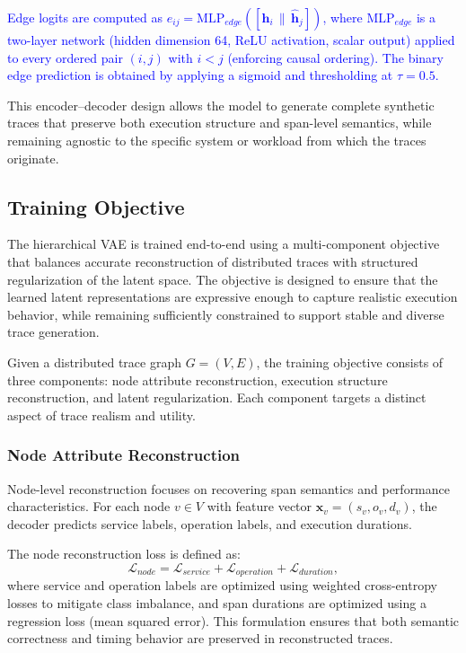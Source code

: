 \documentclass[sigconf,review]{acmart}
\begin{document}
\textcolor{blue}{Edge logits are computed as $e_{ij} = \text{MLP}_{edge}([\hat{\mathbf{h}}_i \,\|\, \hat{\mathbf{h}}_j])$, where $\text{MLP}_{edge}$ is a two-layer network (hidden dimension 64, ReLU activation, scalar output) applied to every ordered pair $(i,j)$ with $i < j$ (enforcing causal ordering). The binary edge prediction is obtained by applying a sigmoid and thresholding at $\tau = 0.5$.}

This encoder--decoder design allows the model to generate complete synthetic traces that preserve both execution structure and span-level semantics, while remaining agnostic to the specific system or workload from which the traces originate.




\subsection{Training Objective}
\label{sec:training}

The hierarchical VAE is trained end-to-end using a multi-component objective that balances accurate reconstruction of distributed traces with structured regularization of the latent space. The objective is designed to ensure that the learned latent representations are expressive enough to capture realistic execution behavior, while remaining sufficiently constrained to support stable and diverse trace generation.

Given a distributed trace graph $G = (V, E)$, the training objective consists of three components: node attribute reconstruction, execution structure reconstruction, and latent regularization. Each component targets a distinct aspect of trace realism and utility.

\subsubsection{Node Attribute Reconstruction}

Node-level reconstruction focuses on recovering span semantics and performance characteristics. For each node $v \in V$ with feature vector $\mathbf{x}_v = (s_v, o_v, d_v)$, the decoder predicts service labels, operation labels, and execution durations.

The node reconstruction loss is defined as:
\begin{equation}
\mathcal{L}_{node} =
\mathcal{L}_{service} +
\mathcal{L}_{operation} +
\mathcal{L}_{duration},
\end{equation}
where service and operation labels are optimized using weighted cross-entropy losses to mitigate class imbalance, and span durations are optimized using a regression loss (mean squared error). This formulation ensures that both semantic correctness and timing behavior are preserved in reconstructed traces.
\end{document}
